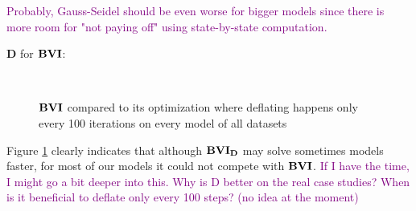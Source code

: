 \textcolor{purple}{Probably, Gauss-Seidel should be even worse for bigger models since there is more room for "not paying off" using state-by-state computation.}


$\mathbf{D}$ for $\mathbf{BVI}$:
\begin{figure}[h!]
    \centering
    \
    \caption{$\mathbf{BVI}$ compared to its optimization where deflating happens only every 100 iterations on every model of all datasets}%
    \label{fig:Scatter_D}%
    \end{figure}
\FloatBarrier
Figure \ref{fig:Scatter_D} clearly indicates that although $\mathbf{BVI_D}$ may solve sometimes models faster, 
for most of our models it could not compete with $\mathbf{BVI}$.
\textcolor{purple}{If I have the time, I might go a bit deeper into this. Why is D better on the real case studies?
When is it beneficial to deflate only every 100 steps? (no idea at the moment)}


